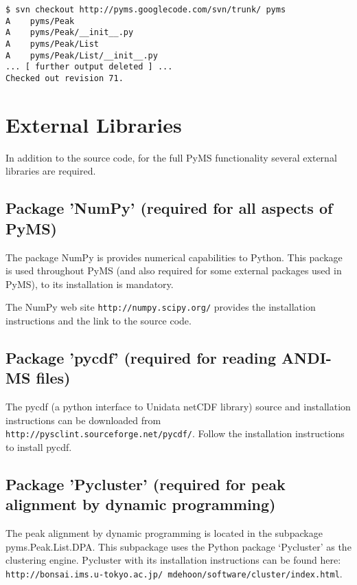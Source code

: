 \begin{verbatim}
$ svn checkout http://pyms.googlecode.com/svn/trunk/ pyms
A    pyms/Peak
A    pyms/Peak/__init__.py
A    pyms/Peak/List
A    pyms/Peak/List/__init__.py
... [ further output deleted ] ...
Checked out revision 71.
\end{verbatim}

\section{\label{sec:external-libraries}External Libraries}

In addition to the source code, for the full PyMS functionality
several external libraries are required.

\subsection{\label{subsec:numpy}Package 'NumPy' (required for all
aspects of PyMS)}

The package NumPy is provides numerical capabilities to Python. This
package is used throughout PyMS (and also required for some external
packages used in PyMS), to its installation is mandatory.

The NumPy web site {\tt http://numpy.scipy.org/} provides the installation
instructions and the link to the source code.

\subsection{\label{subsec:pycdf}Package 'pycdf' (required for reading
ANDI-MS files)}

The pycdf (a python interface to Unidata netCDF library) source and
installation instructions can be downloaded from\\
{\tt http://pysclint.sourceforge.net/pycdf/}. Follow the installation
instructions to install pycdf.

\subsection{\label{subsec:pycluster}Package 'Pycluster' (required for peak
alignment by dynamic programming)}

The peak alignment by dynamic programming is located in the subpackage
pyms.Peak.List.DPA. This subpackage uses the Python package `Pycluster'
as the clustering engine. Pycluster with its installation instructions
can be found here:\\
{\tt http://bonsai.ims.u-tokyo.ac.jp/~mdehoon/software/cluster/index.html}.

